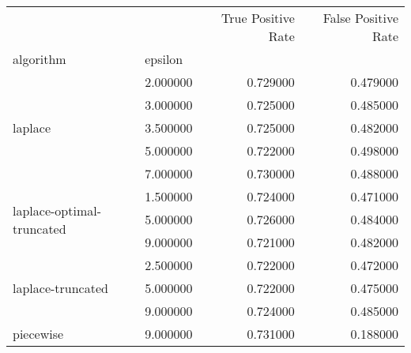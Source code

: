 \begin{tabular}{llrr}
\toprule
 &  & True Positive Rate & False Positive Rate \\
algorithm & epsilon &  &  \\
\midrule
\multirow[t]{5}{*}{laplace} & 2.000000 & 0.729000 & 0.479000 \\
 & 3.000000 & 0.725000 & 0.485000 \\
 & 3.500000 & 0.725000 & 0.482000 \\
 & 5.000000 & 0.722000 & 0.498000 \\
 & 7.000000 & 0.730000 & 0.488000 \\
\cline{1-4}
\multirow[t]{3}{*}{laplace-optimal-truncated} & 1.500000 & 0.724000 & 0.471000 \\
 & 5.000000 & 0.726000 & 0.484000 \\
 & 9.000000 & 0.721000 & 0.482000 \\
\cline{1-4}
\multirow[t]{3}{*}{laplace-truncated} & 2.500000 & 0.722000 & 0.472000 \\
 & 5.000000 & 0.722000 & 0.475000 \\
 & 9.000000 & 0.724000 & 0.485000 \\
\cline{1-4}
piecewise & 9.000000 & 0.731000 & 0.188000 \\
\cline{1-4}
\bottomrule
\end{tabular}
